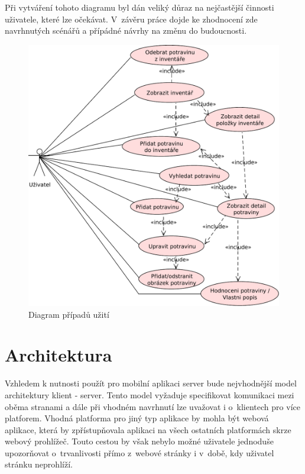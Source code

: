 \documentclass[thesis=B,czech]{FITthesis}[2013/10/20]
\begin{document}
Při vytváření tohoto diagramu byl dán veliký důraz na nejčastější činnosti uživatele, které lze očekávat. V~závěru práce dojde ke zhodnocení zde navrhnutých scénářů a přípádné návrhy na změnu do budoucnosti.

\begin{figure}[H]
  \centering
  \includegraphics[scale=0.75]{diagrams/use_case}
  \caption{Diagram případů užití}
  \label{fig:UseCase}
\end{figure}

\section{Architektura}

Vzhledem k nutnosti použít pro mobilní aplikaci server bude nejvhodnější model architektury klient - server. Tento model vyžaduje specifikovat komunikaci mezi oběma stranami a dále při vhodném navrhnutí lze uvažovat i o~klientech pro více platforem. Vhodná platforma pro jiný typ aplikace by mohla být webová aplikace, která by zpřístupňovala aplikaci na všech ostatních platformách skrze webový prohlížeč. Touto cestou by však nebylo možné uživatele jednoduše upozorňovat o~trvanlivosti přímo z~webové stránky i v~době, kdy uživatel stránku neprohlíží.
\end{document}
